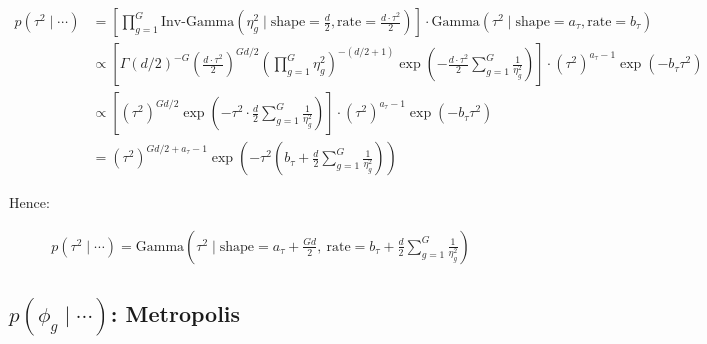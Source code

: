 \documentclass{article}\usepackage{graphicx, color}
\begin{document}
\begin{flushleft}
\begin{align*}
p(\tau^2 \mid \cdots) &= \left [ \prod_{g = 1}^G \text{Inv-Gamma} \left ( \eta_g^2 \mid \text{shape} = \frac{d}{2}, \text{rate} = \frac{d \cdot \tau^2}{2} \right ) \right ] \cdot \text{Gamma}(\tau^2 \mid \text{shape} = a_\tau, \text{rate} = b_\tau) \\
&\propto \left [ \Gamma \left( d/2 \right )^{-G} \left ( \frac{d \cdot \tau^2}{2}\right ) ^ { G d  /2 } \left ( \prod_{g = 1}^G { \eta_g^2} \right )^{ -(d/2 + 1)} \exp \left (- \frac{d \cdot \tau^2}{2} \sum_{g = 1}^G \frac{1}{ \eta_g^2} \right ) \right ] \cdot (\tau^2)^{a_\tau - 1} \exp \left (- b_\tau \tau^2 \right )  \\
& \propto \left [ \left ( \tau^2 \right ) ^ { G d  /2 } \exp \left (- \tau^2 \cdot \frac{d}{2} \sum_{g = 1}^G \frac{1}{ \eta_g^2} \right ) \right ] \cdot (\tau^2)^{a_\tau - 1} \exp \left (- b_\tau \tau^2 \right )  \\
&= (\tau^2)^{Gd/2 + a_\tau - 1} \exp \left (- \tau^2 \left (b_\tau + \frac{d}{2} \sum_{g = 1}^G \frac{1}{\eta_g^2} \right )  \right ) 
\end{align*}

Hence:

\begin{align*}
p(\tau^2 \mid \cdots) = \text{Gamma} \left ( \tau^2 \mid \text{shape} =  a_\tau + \frac{Gd}{2}, \ \text{rate} =  b_\tau + \frac{d}{2} \sum_{g = 1}^G \frac{1}{\eta_g^2} \right ) 
\end{align*}










\subsection{$p(\phi_g \mid \cdots)$: Metropolis}


\end{flushleft}
\end{document}
